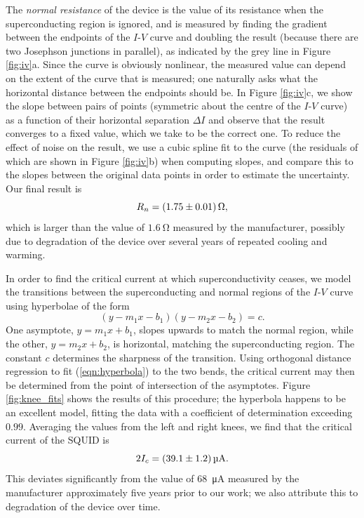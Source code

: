\documentclass[twocol]{ametsocV6.1}
\begin{document}
The \emph{normal resistance} of the device is the value of its resistance
when the superconducting region is ignored, and is measured by finding the
gradient between the endpoints of the $I$-$V$ curve and doubling the result
(because there are two Josephson junctions in parallel),
as indicated by the grey line in Figure \ref{fig:iv}a.
Since the curve is obviously nonlinear, the measured value can depend on the
extent of the curve that is measured; one naturally asks what the
horizontal distance between the endpoints should be.
In Figure \ref{fig:iv}c, we show the
slope between pairs of points (symmetric about the centre of the $I$-$V$ curve)
as a function of their horizontal separation $\Delta I$ and observe that
the result converges to a fixed value, which we take to be the correct one.
To reduce the effect of noise on the result, we use a cubic spline fit to the
curve (the residuals of which are shown in Figure \ref{fig:iv}b) when
computing slopes, and compare this to the slopes between the original data
points in order to estimate the uncertainty. Our final result is
\begin{equation}
	R_n = \SI{1.75 \pm 0.01}{\ohm},
\end{equation}
which is larger than the value of $\SI{1.6}{\ohm}$ measured by the
manufacturer, possibly due to degradation of the device over several years
of repeated cooling and warming.

In order to find the critical current at which superconductivity ceases,
we model the transitions between the superconducting and normal regions
of the $I$-$V$ curve using hyperbolae of the form
\begin{equation}
	(y - m_1 x - b_1)(y - m_2 x - b_2) = c. \label{eqn:hyperbola}
\end{equation}
One asymptote, $y = m_1 x + b_1$, slopes upwards to match the normal region,
while the other, $y = m_2 x + b_2$, is horizontal, matching the superconducting
region. The constant $c$ determines the sharpness of the transition. Using
orthogonal distance regression to fit (\ref{eqn:hyperbola}) to the two
bends, the critical current may then be determined from the point of
intersection of the asymptotes. Figure \ref{fig:knee_fits} shows the results
of this procedure; the hyperbola happens to be an excellent model, fitting
the data with a coefficient of determination exceeding $0.99$.
Averaging the values from the left and right knees,
we find that the critical current of the SQUID is
\begin{equation}
	2 I_c = \SI{39.1 \pm 1.2}{\micro\ampere}. \label{eqn:critical_current}
\end{equation}
This deviates significantly from the value of \SI{68}{\micro\ampere}
measured by the manufacturer approximately five years prior to our
work; we also attribute this to degradation of the device over time.
\end{document}
